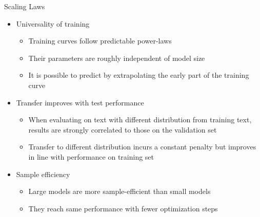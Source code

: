 \begin{vbframe}{Scaling Laws}

\vfill

\begin{itemize}

	\item Universality of training
	\begin{itemize}
	\item Training curves follow predictable power-laws
	\item Their parameters are roughly independent of model size
	\item It is possible to predict by extrapolating the early part of the training curve
	\end{itemize}

	\item Transfer improves with test performance
	\begin{itemize}
	\item When evaluating on text with different distribution from training text, results are strongly correlated to those on the validation set
	\item Transfer to different distribution incurs a constant penalty but improves in line with performance on training set
	\end{itemize}

	\item Sample efficiency
	\begin{itemize}
	\item Large models are more sample-efficient than small models
	\item They reach same performance with fewer optimization steps
	\end{itemize}

\end{itemize}

\vfill

\end{vbframe}


